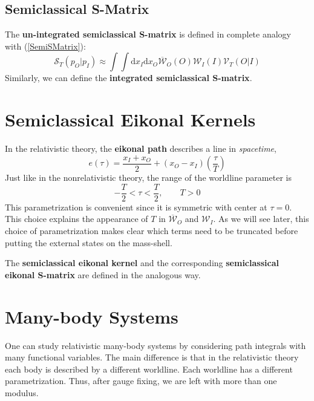 \subsection{Semiclassical S-Matrix}
The \textbf{un-integrated semiclassical S-matrix} is defined in complete analogy with (\ref{SemiSMatrix}):
\begin{equation}
	\mathcal{S}_{T}(p_{O}| p_{I}) \approx \int \int \mathrm{d}x_{I} \mathrm{d}x_{O} \overline{\mathcal{W}}_{O}(O) \mathcal{W}_{I}(I) \mathcal{V}_{T}(O|I)
\end{equation}
Similarly, we can define the \textbf{integrated semiclassical S-matrix}.
\section{Semiclassical Eikonal Kernels}
In the relativistic theory, the \textbf{eikonal path} describes a line in \textit{spacetime},
\begin{equation}
	e(\tau) = \frac{x_{I} + x_{O}}{2} + \left( x_{O} - x_{I} \right) \left( \frac{\tau}{T} \right)
\end{equation}
Just like in the nonrelativistic theory, the range of the worldline parameter is
\begin{equation}
	{- \frac{T}{2} } < \tau < \frac{T}{2}, \qquad T > 0
\end{equation}
This parametrization is convenient since it is symmetric with center at $\tau = 0$. This choice explains the appearance of $T$ in $\overline{\mathcal{W}}_{O}$ and $\mathcal{W}_{I}$. As we will see later, this choice of parametrization makes clear which terms need to be truncated before putting the external states on the mass-shell.

The \textbf{semiclassical eikonal kernel} and the corresponding \textbf{semiclassical eikonal S-matrix} are defined in the analogous way.
\section{Many-body Systems}
One can study relativistic many-body systems by considering path integrals with many functional variables. The main difference is that in the relativistic theory each body is described by a different worldline. Each worldline has a different parametrization. Thus, after gauge fixing, we are left with more than one modulus.


